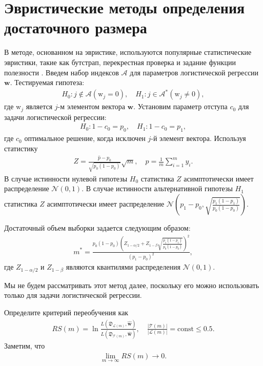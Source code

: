\section{Эвристические методы определения достаточного размера}
В методе, основанном на эвристике, используются популярные статистические эвристики, такие как бутстрап, перекрестная проверка и задание функции полезности .
Введем набор индексов $\mathcal {A} $ для параметров логистической регрессии $\textbf {w} $. Тестируемая гипотеза:
\[
\label{eq:hb:1}
\begin{aligned}
	H_0: j \not\in\mathcal{A} \left(\text{w}_{j} = 0\right), \quad H_1: j \in \mathcal{A}^* \left(\text{w}_{j} \not= 0\right),
\end{aligned}
\]
где $\text{w}_{j}$ является $j$-м элементом вектора $\textbf{w}$.
Установим параметр отступа $ c_0 $ для задачи логистической регрессии:
\[
\label{eq:hb:2}
\begin{aligned}
	H_0: 1-c_0 = p_0, \quad H_1: 1-c_0 = p_1,
\end{aligned}
\]
где $c_0$ оптимальное решение, когда исключен $j$-й элемент вектора.
Используя статистику
\[
\label{eq:hb:3}
\begin{aligned}
	Z = \frac{\hat{p}-p_0}{\sqrt{p_0(1-p_0)}}\sqrt{m}, \quad \hat{p} = \frac{1}{m}\sum_{i=1}^{m}y_i.
\end{aligned}
\]
В случае истинности нулевой гипотезы $H_0$ статистика $Z$ асимптотически имеет распределение $\mathcal{N}\left(0, 1\right)$. В случае истинности альтернативной гипотезы $H_1$ статистика $Z$  асимптотически имеет распределение $ \mathcal{N}\left(p_1-p_0, \sqrt{\frac{p_1(1-p_1)}{p_0(1-p_0)}}\right)$.
      
Достаточный объем выборки задается следующим образом:
\[
\label{eq:hb:4}
\begin{aligned}
	m^* = \frac{p_0(1-p_0)\left(Z_{1-\alpha/2} + Z_{1-\beta}\sqrt{\frac{p_1(1-p_1)}{p_0(1-p_0)}}\right)^2}{(p_1-p_0)^2},
\end{aligned}
\]
где $Z_{1-\alpha/2}$ и $Z_{1-\beta}$ являются квантилями распределения $\mathcal{N}\left(0, 1\right)$.
    
Мы не будем рассматривать этот метод далее, поскольку его можно использовать только для задачи логистической регрессии.
    
Определите критерий переобучения как
\[
\label{eq:hb:5}
\begin{aligned}
	RS(m) = \ln\frac{L(\mathfrak{D}_{\mathcal{L}(m)}, \hat{\textbf{w}})}{L(\mathfrak{D}_{\mathcal{T}(m)}, \hat{\textbf{w}})}, \quad \frac{|\mathcal{T}(m)|}{|\mathcal{L}(m)|} = \text{const} \leq 0.5.
\end{aligned}
\]
Заметим, что
\[
\label{eq:hb:6}
\begin{aligned}
	\lim_{m\to \infty}RS(m) \to 0.
\end{aligned}
\]

